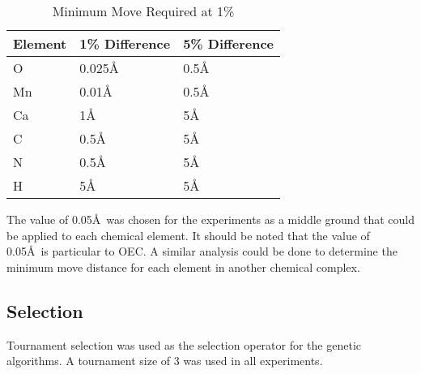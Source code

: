 \begin{table}
	\centering
	\begin{tabular}{ | l | l | l | }
		\hline
		Element & 1\% Difference & 5\% Difference \\ \hline
		O & 0.025\AA & 0.5\AA \\ \hline
		Mn & 0.01\AA & 0.5\AA \\ \hline
		Ca & 1\AA & 5\AA \\ \hline
		C & 0.5\AA & 5\AA \\ \hline
		N & 0.5\AA & 5\AA \\ \hline
		H & 5\AA & 5\AA \\ \hline
	\end{tabular}
	\caption{Minimum Move Required at 1\%}
	\label{table:minMove}
\end{table}

The value of 0.05\AA\ was chosen for the experiments as a middle ground that could be applied to each chemical element. It should be noted that the value of 0.05\AA\ is particular to OEC. A similar analysis could be done to determine the minimum move distance for each element in another chemical complex.

\subsection{Selection}

Tournament selection was used as the selection operator for the genetic algorithms. A tournament size of 3 was used in all experiments.